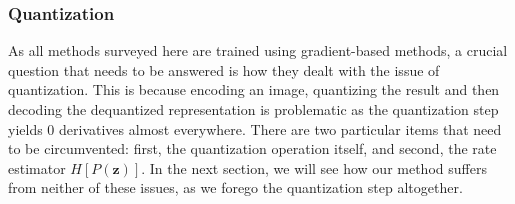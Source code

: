 \documentclass{article}
\renewcommand{\vec}[1]{\mathbf{#1}}
\begin{document}
\subsubsection{Quantization}
\label{sec:comp_quant}
\par
As all methods surveyed here are trained using gradient-based methods, a crucial
question that needs to be answered is how they dealt with the issue of
quantization. This is because encoding an image, quantizing the result and then
decoding the dequantized representation is problematic as the quantization step
yields 0 derivatives almost everywhere. There are two particular items that need
to be circumvented: first, the quantization operation itself, and second, the
rate estimator $H[P(\vec{z})]$. In the next section, we will see how our method
suffers from neither of these issues, as we forego the quantization step altogether.
\end{document}
